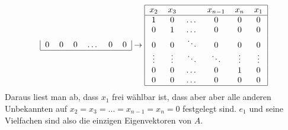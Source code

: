 \begin{loesung}
\[\begin{tabular}{|cccccc|}
0       &0       &0       &$ \dots$&0       &0       \\
\hline
\end{tabular}
\rightarrow
\begin{tabular}{|cccccc|}
\hline
$x_2$&$x_3$&&$x_{n-1}$&$x_n$&$x_1$\\
\hline
1       &0       &$ \dots$&0       &0       &0        \\
0       &1       &$ \dots$&0       &0       &0        \\
0       &0       &$\ddots$&0       &0       &0        \\
$\vdots$&$\vdots$&$\ddots$&$\ddots$&$\vdots$&$\vdots$ \\
0       &0       &$ \dots$&0       &1       &0        \\
0       &0       &$ \dots$&0       &0       &0        \\
\hline
\end{tabular}
\]
Daraus liest man ab, dass $x_1$ frei wählbar ist, dass aber
aber alle anderen Unbekannten auf $x_2=x_3=\dots=x_{n-1}=x_n=0$
festgelegt sind. $e_1$ und seine Vielfachen sind also die einzigen
Eigenvektoren von $A$.
\end{loesung}

